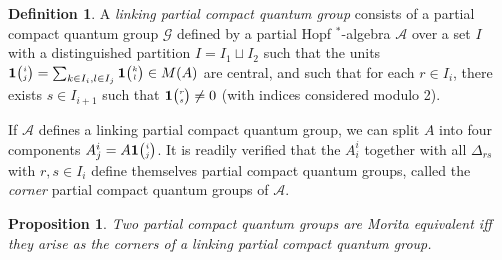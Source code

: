 \documentclass[10pt]{article}
\newcommand{\Grt}[3]{#1{\tiny {\begin{pmatrix} #2\\#3\end{pmatrix}}}}
\newcommand{\UnitC}[2]{\Grt{\mathbf{1}}{#1}{#2}}
\newtheorem{Prop}[Theorem]{Proposition}
\theoremstyle{definition}
\newtheorem{Def}[Theorem]{Definition}
\numberwithin{equation}{section}
\begin{document}

\begin{Def} A \emph{linking partial compact quantum group} consists of a partial compact quantum group $\mathscr{G}$ defined by a partial Hopf $^*$-algebra $\mathscr{A}$ over a set $I$ with a distinguished partition $I = I_1\sqcup I_2$ such that the units $\UnitC{i}{j} = \sum_{k\in I_i,l\in I_j} \UnitC{k}{l} \in M(A)$ are central, and such that for each $r\in I_i$, there exists $s\in I_{i+1}$ such that $\UnitC{r}{s}\neq 0$ (with indices considered modulo 2).
\end{Def}

If $\mathscr{A}$ defines a linking partial compact quantum group, we can split $A$ into four components $A^i_j = A\UnitC{i}{j}$. It is readily verified that the $A^i_i$ together with all $\Delta_{rs}$ with $r,s \in I_i$ define themselves partial compact quantum groups, called the \emph{corner} partial compact quantum groups of $\mathscr{A}$. 

\begin{Prop} Two partial compact quantum groups are Morita equivalent iff they arise as the corners of a linking partial compact quantum group.
\end{Prop}
\end{document}
